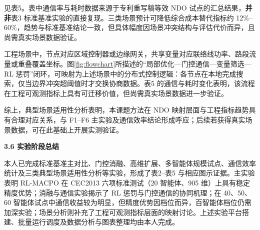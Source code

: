 \par
\indent
\par
见表5。表中通信率与耗时数据来源于专利重写稿等效 NDO 试点的汇总结果，\textbf{并非}表3 标准基准实验的直接复现。三类场景预计可降低综合成本替代指标约 12\%--60\%，趋势与标准基准结论一致，但具体幅度因场景冲突结构与评估代价而异，且尚需真实场景数据验证。

\par{}

\par
\indent
\par
工程场景中，节点对应区域控制器或边缘网关，共享变量对应联络线功率、路段流量或重叠覆盖坐标。图\ref{fig:flowchart}所描述的“局部优化—门控通信—变量筛选—RL 惩罚”闭环，可映射为上述场景中的分布式控制逻辑：各节点在本地完成搜索，仅当边界冲突超阈值时才交换协商数据。表5 的通信与耗时变化表明，该流程在工程可观测指标上具有可迁移价值，但尚需真实场景数据进一步验证。

\par
\indent
综上，典型场景适用性分析表明，本课题方法在 NDO 映射层面与工程指标趋势具有合理对应关系，与 F1--F6 主实验及通信效率结论形成呼应；后续若获得真实场景数据，可在此基础上开展实测验证。

\par
\indent
\textbf{3.6 实验阶段总结}
\par
本人已完成标准基准主对比、门控消融、高维扩展、多智能体规模试点、通信效率统计及三类典型场景适用性分析等实验，形成了表2--表5 与相应图示证据。主实验表明 RL-MACPO 在 CEC2013 六项标准测试（20 智能体、905 维）上具有稳定精度优势；消融与通信实验揭示了 RL 惩罚与门控通信的协同机理；在 40、50、60 智能体试点中通信收益较为明显，但精度优势因档位而异，百智能体档位仍需加深实验；场景分析则补充了工程可观测指标层面的映射讨论。上述实验平台搭建、批量运行调度及数据分析与图表整理均由本人完成。

